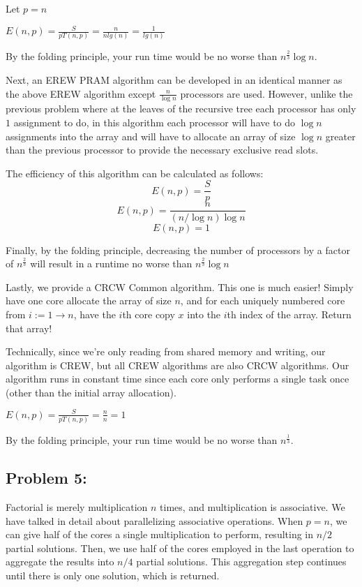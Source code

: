 \documentclass[12pt]{article}
\begin{document}
Let $p=n$

$E(n, p) = \frac{S}{pT(n, p)} = \frac{n}{nlg(n)} = \frac{1}{lg(n)}$

By the folding principle, your run time would be no worse than $n^{\frac{2}{3}}\log n$.

Next, an EREW PRAM algorithm can be developed in an identical manner as the above EREW algorithm except
$\frac{n}{\log n}$ processors are used.  However, unlike the previous problem where at the leaves of the
recursive tree each processor has only $1$ assignment to do, in this algorithm each processor will have
to do $\log n$ assignments into the array and will have to allocate an array of size $\log n$ greater
than the previous processor to provide the necessary exclusive read slots.

The efficiency of this algorithm can be calculated as follows:
\[
E(n,p) = \frac{S}{p}\]
\[
E(n,p) = \frac{n}{(n/\log n)\log n}
\]
\[
E(n,p) = 1 
\]
 
Finally, by the folding principle, decreasing the number of processors by a factor of $n^{\frac{2}{3}}$
will result in a runtime no worse than $n^{\frac{2}{3}}\log n$ 

Lastly, we provide a CRCW Common algorithm. This one is much easier! Simply have one core allocate the array of size $n$, and for each uniquely numbered core from $i := 1 \to n$, have the $i$th core copy $x$ into the $i$th index of the array. Return that array!

Technically, since we're only reading from shared memory and writing, our algorithm is CREW, but all CREW algorithms are also CRCW algorithms. Our algorithm runs in constant time since each core only performs a single task once (other than the initial array allocation).

$E(n, p) = \frac{S}{pT(n, p)} = \frac{n}{n} = 1$

By the folding principle, your run time would be no worse than $n^{\frac{1}{3}}$.

\subsection*{Problem 5: }

Factorial is merely multiplication $n$ times, and multiplication is associative. We have talked in detail about parallelizing associative operations. 
When $p=n$, we can give half of the cores a single multiplication to perform, resulting in $n/2$ partial solutions. Then, we use half of the cores employed in the last operation to aggregate the results into $n/4$ partial solutions. This aggregation step continues until there is only one solution, which is returned.
\end{document}
